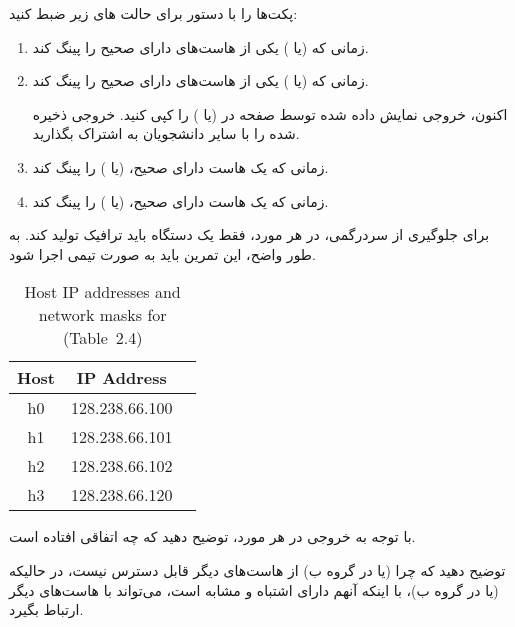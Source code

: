 \documentclass{../UTNetLabFa}
\begin{document}
	پکت‌ها را با دستور  برای حالت های زیر ضبط کنید:
	
		\begin{enumerate}
		\item 
			زمانی که  (یا ) یکی از هاست‌های دارای  صحیح را پینگ کند.
		\item 
		زمانی که  (یا ) یکی از هاست‌های دارای  صحیح را پینگ کند.
		
		اکنون، خروجی نمایش داده شده توسط صفحه  در  (یا ) را کپی کنید. خروجی ذخیره شده را با سایر دانشجویان به اشتراک بگذارید.
		
		\item 
		زمانی که یک هاست دارای  صحیح،  (یا ) را پینگ کند.
		\item 
		زمانی که یک هاست دارای  صحیح،  (یا ) را پینگ کند.
		\end{enumerate}
	
		برای جلوگیری از سردرگمی، در هر مورد، فقط یک دستگاه باید ترافیک تولید کند. به طور واضح، این تمرین باید به صورت تیمی اجرا شود.
		
		    \begin{figure}[h]
				\centering
			\end{figure}
		{
			\begin{table}[H]
				\caption{Host IP addresses and network masks for %
				(Table~2.4)}
				\label{tab:2.4}
				\centering
				\begin{tabular}{ c c c }
					\hline \hline
					Host & IP Address & \makebox[7.3em][c]{Subnet Mask} \\
					\hline 
					h0 & 128.238.66.100 & \makebox[7.3em][l]{255.255.255.240} \\
					h1 & 128.238.66.101 & \makebox[7.3em][l]{255.255.255.0} \\
					h2 & 128.238.66.102 & \makebox[7.3em][l]{255.255.255.0} \\
					h3 & 128.238.66.120 & \makebox[7.3em][l]{255.255.255.240} \\
					\hline \hline
					\end{tabular}
			\end{table}
		}
		
		\begin{report}
			\item
			با توجه به خروجی  در هر مورد، توضیح دهید که چه اتفاقی افتاده است.
			\item
			توضیح دهید که چرا  (یا  در گروه ب) از هاست‌های دیگر قابل دسترس نیست، در حالیکه  (یا  در گروه ب)، با اینکه آنهم دارای  اشتباه و مشابه است، می‌تواند با هاست‌های دیگر ارتباط بگیرد.
		\end{report}
\end{document}
